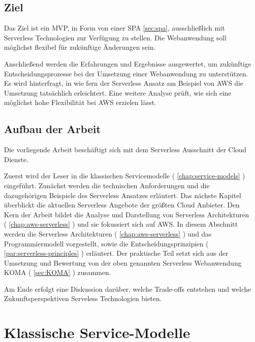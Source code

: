 \documentclass[
12pt,
english,
ngerman,
headsepline,
twoside,
openright,
numbers=noenddot,version=first
]{scrreprt}
\begin{document}
\section{Ziel}
\label{sec:task}
Das Ziel ist ein \acrlong{MVP}, in Form von einer \acrfull{SPA} \autoref{sec:spa}, ausschließlich mit Serverless Technologien zur Verfügung zu stellen.
Die Webanwendung soll möglichst flexibel für zukünftige Änderungen sein.

Anschließend werden die Erfahrungen und Ergebnisse ausgewertet, um zukünftige Entscheidungsprozesse bei der Umsetzung einer Webanwendung zu unterstützen. Es wird hinterfragt, in wie fern der Serverless Ansatz am Beispiel von \acrfull{AWS} die Umsetzung tatsächlich erleichtert. 
Eine weitere Analyse prüft, wie sich eine möglichst hohe Flexibilität bei \acrshort{AWS} erzielen lässt.

\section{Aufbau der Arbeit}
\label{sec:layout}

Die vorliegende Arbeit beschäftigt sich mit dem Serverless Ausschnitt der Cloud Dienste. 

Zuerst wird der Leser in die klassischen Servicemodelle ( \autoref{chap:service-models} ) eingeführt. Zunächst werden die technischen Anforderungen und die dazugehörigen Beispiele des Serverless Ansatzes erläutert.
Das nächste Kapitel überblickt die aktuellen Serverless Angebote der größten Cloud Anbieter.
Den Kern der Arbeit bildet die Analyse und Darstellung von Serverless Architekturen ( \autoref{chap:aws-serverless} ) und sie fokussiert sich auf \acrshort{AWS}. In diesem Abschnitt werden die Serverless Architekturen ( \autoref{chap:aws-serverless} ) und das Programmiermodell vorgestellt, sowie die Entscheidungsprinzipien ( \autoref{par:serverless-principles} ) erläutert.
Der praktische Teil setzt sich aus der Umsetzung und Bewertung von der oben genannten Serverless Webanwendung KOMA ( \autoref{sec:KOMA} ) zusammen.

Am Ende erfolgt eine Diskussion darüber, welche Trade-offs entstehen und welche Zukunftsperspektiven Serveless Technologien bieten.


\chapter{Klassische Service-Modelle}
\label{chap:service-models}
\label{chap:principles}
\end{document}
